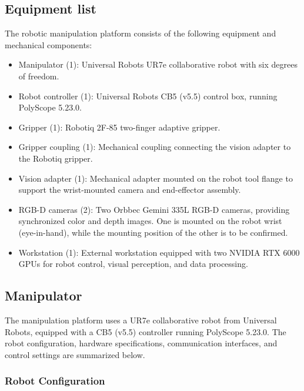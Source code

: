 \documentclass[11pt,a4paper]{article}
\begin{document}
\subsection{Equipment list}
\label{sec:equipment_list}

The robotic manipulation platform consists of the following
equipment and mechanical components:

\begin{itemize}
    \item Manipulator (1): Universal Robots UR7e collaborative robot with six degrees of freedom.
    \item Robot controller (1): Universal Robots CB5 (v5.5) control box, running PolyScope 5.23.0.
    \item Gripper (1): Robotiq 2F-85 two-finger adaptive gripper.
    \item Gripper coupling (1): Mechanical coupling connecting the vision adapter to the Robotiq gripper.
    \item Vision adapter (1): Mechanical adapter mounted on the robot tool flange to support the wrist-mounted camera and end-effector assembly.
    \item RGB-D cameras (2): Two Orbbec Gemini 335L RGB-D cameras, providing synchronized color and depth images. One is mounted on the robot wrist (eye-in-hand), while the mounting position of the other is to be confirmed.
    \item Workstation (1): External workstation equipped with two NVIDIA RTX 6000 GPUs for robot control, visual perception, and data processing.
\end{itemize}


\subsection{Manipulator}
\label{sec:manipulator}

The manipulation platform uses a UR7e collaborative robot
from Universal Robots, equipped with a CB5 (v5.5)
controller running PolyScope 5.23.0.
The robot configuration, hardware specifications,
communication interfaces, and control settings
are summarized below.


\subsubsection{Robot Configuration}
\end{document}
